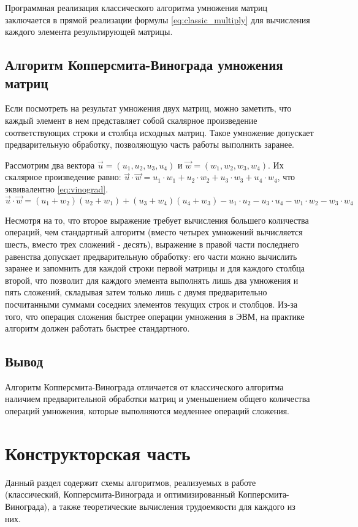 \documentclass[a4paper,oneside,14pt]{extreport}
\begin{document}
Программная реализация классического алгоритма умножения матриц заключается в прямой реализации формулы \ref{eq:classic_multiply} для вычисления каждого элемента результирующей матрицы.

\section{Алгоритм Копперсмита-Винограда умножения матриц}
Если посмотреть на результат умножения двух матриц, можно заметить, что каждый элемент в нем представляет собой скалярное произведение соответствующих строки и столбца исходных матриц.
Такое умножение допускает предварительную обработку, позволяющую часть работы выполнить заранее.

Рассмотрим два вектора $\vec{u} = (u_1, u_2, u_3, u_4)$ и $\vec{w} = (w_1, w_2, w_3, w_4)$.
Их скалярное произведение равно: $\vec{u} \cdot \vec{w} = u_1 \cdot w_1 + u_2 \cdot w_2 + u_3 \cdot w_3 + u_4 \cdot w_4$, что эквивалентно \ref{eq:vinograd}.
\begin{equation}
\label{eq:vinograd}
\vec{u} \cdot \vec{w} = (u_1 + w_2)(u_2 + w_1) + (u_3 + w_4)(u_4 + w_3) - u_1 \cdot u_2 - u_3 \cdot u_4 - w_1 \cdot w_2 - w_3 \cdot w_4
\end{equation}

Несмотря на то, что второе выражение требует вычисления большего количества операций, чем стандартный алгоритм (вместо четырех умножений вычисляется шесть, вместо трех сложений - десять), выражение в правой части последнего равенства допускает предварительную обработку: его части можно вычислить заранее и запомнить для каждой строки первой матрицы и для каждого столбца второй, что позволит для каждого элемента выполнять лишь два умножения и пять сложений, складывая затем только лишь с двумя предварительно посчитанными суммами соседних элементов текущих строк и столбцов.
Из-за того, что операция сложения быстрее операции умножения в ЭВМ, на практике алгоритм должен работать быстрее стандартного.

\section{Вывод}
Алгоритм Копперсмита-Винограда отличается от классического алгоритма наличием предварительной обработки матриц и уменьшением общего количества операций умножения, которые выполняются медленнее операций сложения.
\newpage
\chapter{Конструкторская часть}
Данный раздел содержит схемы алгоритмов, реализуемых в работе (классический, Копперсмита-Винограда и оптимизированный Копперсмита-Винограда), а также теоретические вычисления трудоемкости для каждого из них.
\end{document}
